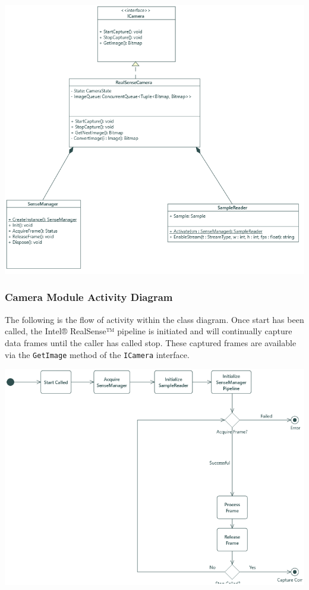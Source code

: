 \documentclass[12pt]{article}
\let\origfigure=\figure
\let\endorigfigure=\endfigure
\renewenvironment{figure}[1][]{%
  \origfigure[H]
}{%
  \endorigfigure
}
\begin{document}
\begin{figure}
\centering
\includegraphics{Figures/CameraModuleClass.png}
\caption{Camera Module Class Diagram}
\end{figure}

\subsubsection{Camera Module Activity
Diagram}\label{camera-module-activity-diagram}

The following is the flow of activity within the class diagram. Once
start has been called, the Intel® RealSense™ pipeline is initiated and
will continually capture data frames until the caller has called stop.
These captured frames are available via the \texttt{GetImage} method of
the \texttt{ICamera} interface.

\begin{figure}
\centering
\includegraphics{Figures/CameraModuleActivity.png}
\caption{Camera Module Activity Diagram}
\end{figure}
\end{document}

